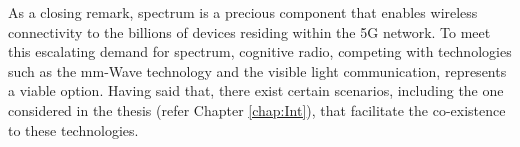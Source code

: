 As a closing remark, spectrum is a precious component that enables wireless connectivity to the billions of devices residing within the 5G network. To meet this escalating demand for spectrum, cognitive radio, competing with technologies such as the mm-Wave technology and the visible light communication, represents a viable option. Having said that, there exist certain scenarios, including the one considered in the thesis (refer Chapter \ref{chap:Int}), that facilitate the co-existence to these technologies. 








